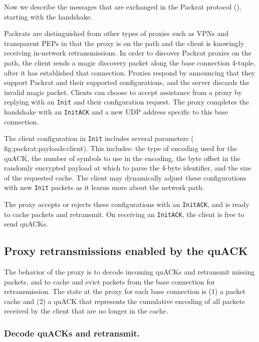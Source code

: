 Now we describe the messages that are exchanged in the
Packrat protocol (), starting with the handshake.

Packrats are distinguished from other types of proxies such as VPNs and
transparent PEPs in that the proxy is on the path and the client is knowingly
receiving in-network retransmissions. In order to discover Packrat proxies on the
path, the client sends a magic discovery packet along the base connection
4-tuple, after it has established that connection. Proxies respond by
announcing that they support Packrat and their supported configurations, and the
server discards the invalid magic packet. Clients can choose to accept
assistance from a proxy by replying with an \texttt{Init} and their
configuration request. The proxy completes the handshake with an \texttt
{InitACK} and a new UDP address specific to this base connection.

The client configuration in \texttt{Init} includes several parameters (\Cref
{fig:packrat:payloads:client}). This includes: the type of encoding used for the quACK,
the number of symbols to use in the encoding, the byte offset in the randomly
encrypted payload at which to parse the 4-byte identifier, and the size of the
requested cache. The client may dynamically adjust these configurations with
new \texttt{Init} packets as it learns more about the network path.

The proxy accepts or rejects these configurations with an \texttt{InitACK},
and is ready to cache packets and retransmit. On receiving an \texttt{InitACK},
the client is free to send quACKs.

\subsection{Proxy retransmissions enabled by the quACK}
\label{sec:packrat:design:proxy}

The behavior of the proxy is to decode incoming quACKs and retransmit missing
packets, and to cache and evict packets from the base connection for
retransmission. The state at the proxy for each base connection is (1) a packet
cache and (2) a quACK that represents the cumulative encoding of all packets
received by the client that are no longer in the cache.

\subsubsection{Decode quACKs and retransmit.}

